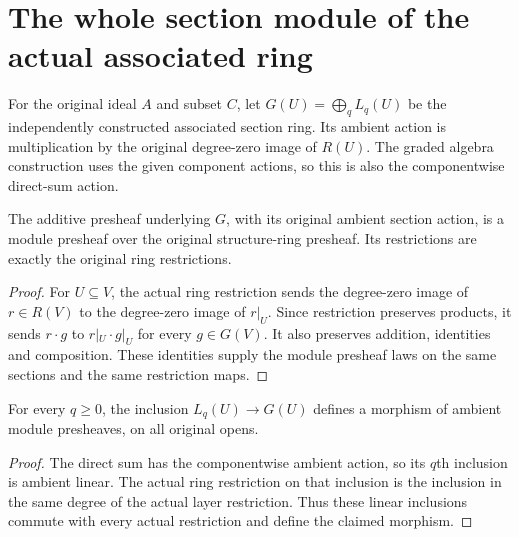 \section{The whole section module of the actual associated ring}

For the original ideal $A$ and subset $C$, let $G(U)=\bigoplus_q L_q(U)$
be the independently constructed associated section ring. Its ambient
action is multiplication by the original degree-zero image of $R(U)$.
The graded algebra construction uses the given component actions, so
this is also the componentwise direct-sum action.

\begin{definition}
\label{hir:real-domain-actual-normal-associated-module-ring-presheaf}
\leanok
The additive presheaf underlying $G$, with its original ambient section
action, is a module presheaf over the original structure-ring presheaf.
Its restrictions are exactly the original ring restrictions.
\end{definition}
\begin{proof}
For $U\subseteq V$, the actual ring restriction sends the degree-zero
image of $r\in R(V)$ to the degree-zero image of $r|_U$. Since restriction
preserves products, it sends $r\cdot g$ to $r|_U\cdot g|_U$ for every
$g\in G(V)$. It also preserves addition, identities and composition.
These identities supply the module presheaf laws on the same sections
and the same restriction maps.
\end{proof}

\begin{lemma}
\label{hir:real-domain-actual-normal-associated-module-ring-degree-inclusions}
\leanok
For every $q\geq0$, the inclusion $L_q(U)\to G(U)$ defines a morphism of
ambient module presheaves, on all original opens.
\end{lemma}
\begin{proof}
The direct sum has the componentwise ambient action, so its $q$th
inclusion is ambient linear. The actual ring restriction on that
inclusion is the inclusion in the same degree of the actual layer
restriction. Thus these linear inclusions commute with every actual
restriction and define the claimed morphism.
\end{proof}


